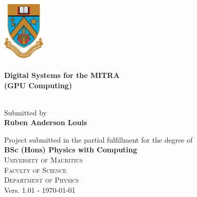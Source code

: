 \begin{titlepage}
\begin{center}
\includegraphics[width=0.15\textwidth]{img/University-of-Mauritius-logo.png}~\\[1cm]


\HRule \\[0.4cm]
{ \huge \bfseries Digital Systems for the MITRA \\[0.4cm] }
{ \LARGE \bfseries (GPU Computing) \\[0.4cm] }

\HRule \\[0.5cm]

{\Large Submitted by}\\[0.2cm]

{\LARGE \bfseries Ruben Anderson Louis \\[2.5cm]}

{\Large Project submitted in the partial fulfillment for the degree of}\\[0.5cm]

{\Large \bfseries BSc (Hons) Physics with Computing}\\[2.0cm]
 
%



\textsc{\LARGE University of Mauritius}\\[0.2cm]
\textsc{\large  Faculty of Science}\\[0.2cm]
\textsc{\large Department of Physics}\\[0.5cm]
{\Large Vers. 1.01 - \today} %
\end{center}
\clearpage
\end{titlepage}


